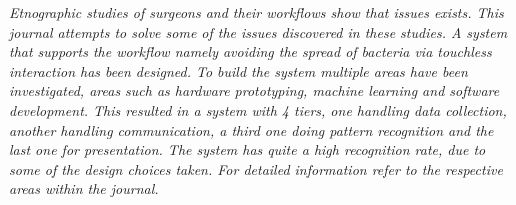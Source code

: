 \textit{Etnographic studies of surgeons and their workflows show that issues exists.
This journal attempts to solve some of the issues discovered in these studies.
A system that supports the workflow namely avoiding the spread of bacteria via touchless interaction has been designed.
To build the system multiple areas have been investigated, areas such as hardware prototyping, machine learning and software development.
This resulted in a system with 4 tiers, one handling data collection, another handling communication, a third one doing pattern recognition and the last one for presentation.
The system has quite a high recognition rate, due to some of the design choices taken.
For detailed information refer to the respective areas within the journal.
}